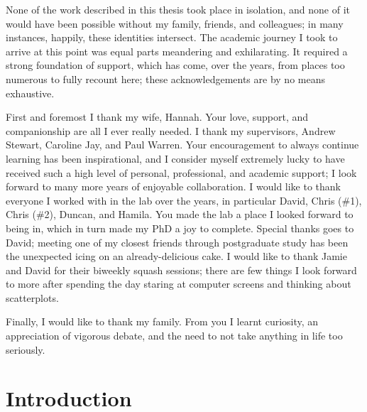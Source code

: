 
\begin{uomacknowledgements} %
None of the work described in this thesis took place in isolation, and none of it would have been possible without my family, friends, and colleagues; in many instances, happily, these identities intersect. The academic journey I took to arrive at this point was equal parts meandering and exhilarating. It required a strong foundation of support, which has come, over the years, from places too numerous to fully recount here; these acknowledgements are by no means exhaustive.

First and foremost I thank my wife, Hannah. Your love, support, and companionship are all I ever really needed. I thank my supervisors, Andrew Stewart, Caroline Jay, and Paul Warren. Your encouragement to always continue learning has been inspirational, and I consider myself extremely lucky to have received such a high level of personal, professional, and academic support; I look forward to many more years of enjoyable collaboration. I would like to thank everyone I worked with in the lab over the years, in particular David, Chris (\#1), Chris (\#2), Duncan, and Hamila. You made the lab a place I looked forward to being in, which in turn made my PhD a joy to complete. Special thanks goes to David; meeting one of my closest friends through postgraduate study has been the unexpected icing on an already-delicious cake. I would like to thank Jamie and David for their biweekly squash sessions; there are few things I look forward to more after spending the day staring at computer screens and thinking about scatterplots.

Finally, I would like to thank my family. From you I learnt curiosity, an appreciation of vigorous debate, and the need to not take anything in life too seriously.
\end{uomacknowledgements}

\chapter{Introduction} \label{chap:introduction}

